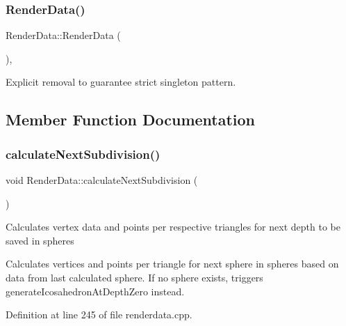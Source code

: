 \subsubsection{\texorpdfstring{Render\+Data()}{RenderData()}\hspace{0.1cm}{\footnotesize\ttfamily [2/2]}}
{\footnotesize\ttfamily Render\+Data\+::\+Render\+Data (\begin{DoxyParamCaption}\item[{const \hyperlink{class_render_data}{Render\+Data} \&}]{ }\end{DoxyParamCaption})\hspace{0.3cm}{\ttfamily [private]}, {\ttfamily [delete]}}



Explicit removal to guarantee strict singleton pattern. 



\subsection{Member Function Documentation}
\mbox{\label{class_render_data_ac1bbf9770f040e452f676358ee699767}} 
\subsubsection{\texorpdfstring{calculate\+Next\+Subdivision()}{calculateNextSubdivision()}}
{\footnotesize\ttfamily void Render\+Data\+::calculate\+Next\+Subdivision (\begin{DoxyParamCaption}{ }\end{DoxyParamCaption})\hspace{0.3cm}{\ttfamily [private]}}

Calculates vertex data and points per respective triangles for next depth to be saved in spheres

Calculates vertices and points per triangle for next sphere in spheres based on data from last calculated sphere. If no sphere exists, triggers \textquotesingle{}generate\+Icosahedron\+At\+Depth\+Zero\textquotesingle{} instead. 

Definition at line 245 of file renderdata.\+cpp.

\mbox{\label{class_render_data_af74f8858b9e0dedb914f24390e140a04}} 
